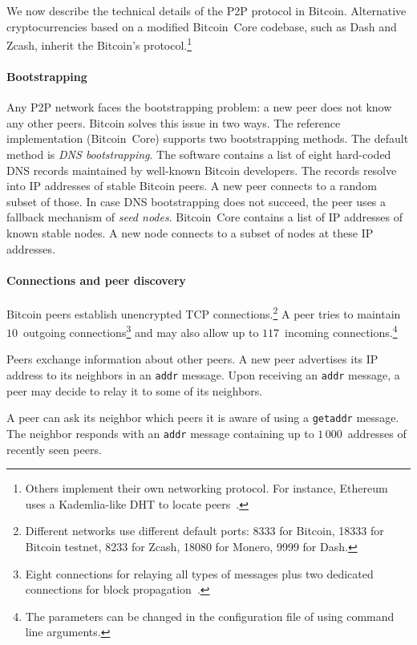 We now describe the technical details of the P2P protocol in Bitcoin.
Alternative cryptocurrencies based on a modified Bitcoin~Core codebase, such as Dash and Zcash, inherit the Bitcoin's protocol.\footnote{Others implement their own networking protocol. For instance, Ethereum uses a Kademlia-like DHT to locate peers~\cite{Henningsen2019}.}

\paragraph{Bootstrapping}

Any P2P network faces the bootstrapping problem: a new peer does not know any other peers.
Bitcoin solves this issue in two ways.
The reference implementation (Bitcoin~Core) supports two bootstrapping methods.
The default method is \textit{DNS bootstrapping}.
The software contains a list of eight hard-coded DNS records maintained by well-known Bitcoin developers.
The records resolve into IP addresses of stable Bitcoin peers.
A new peer connects to a random subset of those.
In case DNS bootstrapping does not succeed, the peer uses a fallback mechanism of \textit{seed nodes}.
Bitcoin~Core contains a list of IP addresses of known stable nodes.
A new node connects to a subset of nodes at these IP addresses.


\paragraph{Connections and peer discovery}

Bitcoin peers establish unencrypted TCP connections.\footnote{Different networks use different default ports: 8333 for Bitcoin, 18333 for Bitcoin testnet, 8233 for Zcash, 18080 for Monero, 9999 for Dash.}
A peer tries to maintain $10$~outgoing connections\footnote{Eight connections for relaying all types of messages plus two dedicated connections for block propagation~\cite{Daftuar2019}.} and may also allow up to $117$~incoming connections.\footnote{The parameters can be changed in the configuration file of using command line arguments.}

Peers exchange information about other peers.
A new peer advertises its IP address to its neighbors in an \texttt{addr} message.
Upon receiving an \texttt{addr} message, a peer may decide to relay it to some of its neighbors.

A peer can ask its neighbor which peers it is aware of using a \texttt{getaddr} message.
The neighbor responds with an \texttt{addr} message containing up to $1\,000$~addresses of recently seen peers.

